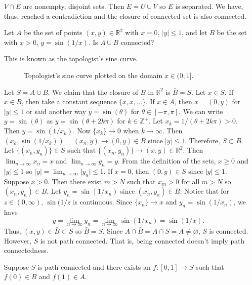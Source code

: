 \begin{exercise}[ref = \arabic{exercisei}]
  \(V\cap E\) are nonempty, disjoint sets.
  Then \(E = U\cup V\) so \(E\) is separated.
  We have, thus, reached a contradiction and the closure of connected set is
  also connected.
\item
  Let \(A\) be the set of points \((x,y)\in\mathbb{R}^2\) with \(x = 0\),
  \(\lvert y\rvert\leq 1\), and let \(B\) be the set with \(x > 0\),
  \(y = \sin(1/x)\).
  Is \(A\cup B\) connected?
  \par\smallskip
  This is known as the topologist's sine curve.
  \begin{figure}[H]
    \centering
    
    \caption{Topologist's sine curve plotted on the domain \(x\in(0,1]\).}
    \label{ch3sec13prob4}
  \end{figure}
  Let \(S = A\cup B\).
  We claim that the closure of \(B\) in \(\mathbb{R}^2\) is \(\bar{B} = S\).
  Let \(x\in S\).
  If \(x\in B\), then take a constant sequence \(\{x,x,\ldots\}\).
  If \(x\in A\), then \(x = (0,y)\) for \(\lvert y\rvert\leq 1\) or said
  another way \(y = \sin(\theta)\) for \(\theta\in[-\pi,\pi]\).
  We can write \(y = \sin(\theta)\) as \(y = \sin(\theta + 2k\pi)\) for
  \(k\in\mathbb{Z}^+\).
  Let \(x_k = 1/(\theta + 2k\pi) > 0\).
  Then \(y = \sin(1/x_k)\).
  Now \(\{x_k\}\to 0\) when \(k\to\infty\).
  Then \((x_k,\sin(1/x_k)) = (x_n,y)\to (0,y)\in\bar{B}\) since
  \(\lvert y\rvert\leq 1\).
  Therefore, \(S\subset\bar{B}\).
  Let \(\{(x_n,y_n)\}\in S\) such that \(\{(x_n,y_n)\}\to
  (x,y)\in\mathbb{R}^2\).
  Then \(\lim_{n\to\infty}x_n = x\) and \(\lim_{n\to\infty}y_n = y\).
  From the definition of the sets, \(x\geq 0\) and \(\lvert y\rvert\leq 1\) so
  \(\lvert y\rvert = \lim_{n\to\infty}\lvert y_n\rvert\leq 1\).
  If \(x = 0\), then \((0,y)\in S\) since \(\lvert y\rvert\leq 1\).
  Suppose \(x > 0\).
  Then there exist \(m > N\) such that \(x_m > 0\) for all \(m > N\) so
  \((x_n,y_n)\in B\).
  Let \(y_n = \sin(1/x_n)\) since \((x_n,y_n)\in B\).
  Notice that for \(z\in(0,\infty)\), \(\sin(1/z\) is continuous.
  Since \(\{x_n\}\to x\) and \(y_n = \sin(1/x_n)\), we have
  \[
  y = \lim_{n\to\infty}y_n = \lim_{n\to\infty}\sin(1/x_n) = \sin(1/x).
  \]
  Thus, \((x,y)\in\bar{B}\subset S\) so \(\bar{B} = S\).
  Since \(A\cap\bar{B} = A\cap S = A\neq\varnothing\), \(S\) is connected.
  However, \(S\) is not path connected.
  That is, being connected doesn't imply path connectedness.
  \par\smallskip
  Suppose \(S\) is path connected and there exists an \(f\colon [0,1]\to S\)
  such that \(f(0)\in B\) and \(f(1)\in A\).

\end{exercise}
